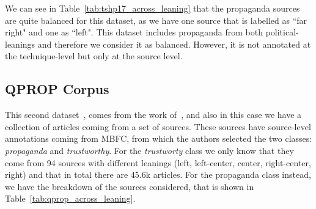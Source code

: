 We can see in Table~\ref{tab:tshp17_across_leaning} that the propaganda sources are quite balanced for this dataset, as we have one source that is labelled as ``far right" and one as ``left".
This dataset includes propaganda from both political-leanings and therefore we consider it as balanced. However, it is not annotated at the technique-level but only at the source level.


\subsection{QPROP Corpus}

This second dataset~\citep{alberto_barron_cedeno_2019_3271522}, comes from the work of~\citet{barron2019proppy}, and also in this case we have a collection of articles coming from a set of sources. These sources have source-level annotations coming from MBFC, from which the authors selected the two classes: \emph{propaganda} and \emph{trustworthy}.
For the \textit{trustworty} class we only know that they come from 94 sources with different leanings (left, left-center, center, right-center, right) and that in total there are 45.6k articles.
For the propaganda class instead, we have the breakdown of the sources considered, that is shown in Table~\ref{tab:qprop_across_leaning}.



